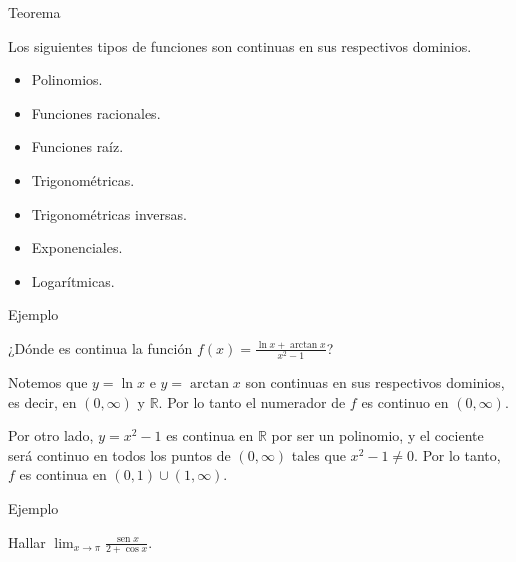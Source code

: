 \documentclass[
  letterpaper,
]{book}
\theoremstyle{plain}
\theoremstyle{remark}
\begin{document}
Teorema

Los siguientes tipos de funciones son continuas en sus respectivos
dominios.

\begin{itemize}
\item
  Polinomios.
\item
  Funciones racionales.
\item
  Funciones raíz.
\item
  Trigonométricas.
\end{itemize}

\begin{itemize}
\item
  Trigonométricas inversas.
\item
  Exponenciales.
\item
  Logarítmicas.
\end{itemize}

Ejemplo

¿Dónde es continua la función
\(\displaystyle f(x)=\frac{\ln x+\arctan x}{x^2-1}\)?

\begin{tcolorbox}[enhanced jigsaw, opacityback=0, left=2mm, opacitybacktitle=0.6, toprule=.15mm, bottomrule=.15mm, colbacktitle=quarto-callout-tip-color!10!white, titlerule=0mm, bottomtitle=1mm, title=\textcolor{quarto-callout-tip-color}{\faLightbulb}\hspace{0.5em}{Solución}, toptitle=1mm, colframe=quarto-callout-tip-color-frame, colback=white, breakable, rightrule=.15mm, arc=.35mm, leftrule=.75mm, coltitle=black]

Notemos que \(y=\ln x\) e \(y=\arctan x\) son continuas en sus
respectivos dominios, es decir, en \((0,\infty)\) y \(\mathbb{R}\). Por
lo tanto el numerador de \(f\) es continuo en \((0,\infty)\).

Por otro lado, \(y=x^2-1\) es continua en \(\mathbb{R}\) por ser un
polinomio, y el cociente será continuo en todos los puntos de
\((0,\infty)\) tales que \(x^2-1\neq 0\). Por lo tanto, \(f\) es
continua en \((0,1)\cup (1,\infty)\).

\end{tcolorbox}

Ejemplo

Hallar
\(\displaystyle \lim_{x\to \pi} \frac{\operatorname{sen} x}{2+\cos x}\).
\end{document}
